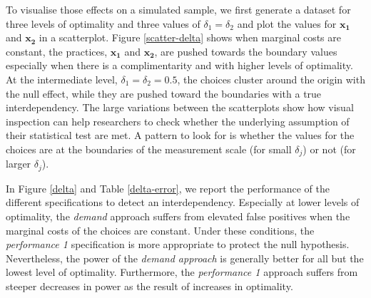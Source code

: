 \documentclass[12pt]{article}
\begin{document}
To visualise those effects on a simulated sample, we first generate a
dataset for three levels of optimality and three values of
\(\delta_1 = \delta_2\) and plot the values for \(\mathbf{x_1}\) and
\(\mathbf{x_2}\) in a scatterplot. Figure \ref{scatter-delta} shows when
marginal costs are constant, the practices, \(\mathbf{x_1}\) and
\(\mathbf{x_2}\), are pushed towards the boundary values especially when
there is a complimentarity and with higher levels of optimality. At the
intermediate level, \(\delta_1 = \delta_2 = 0.5\), the choices cluster
around the origin with the null effect, while they are pushed toward the
boundaries with a true interdependency. The large variations between the
scatterplots show how visual inspection can help researchers to check
whether the underlying assumption of their statistical test are met. A
pattern to look for is whether the values for the choices are at the
boundaries of the measurement scale (for small \(\delta_j\)) or not (for
larger \(\delta_j\)).

In Figure \ref{delta} and Table \ref{delta-error}, we report the
performance of the different specifications to detect an
interdependency. Especially at lower levels of optimality, the
\emph{demand} approach suffers from elevated false positives when the
marginal costs of the choices are constant. Under these conditions, the
\emph{performance 1} specification is more appropriate to protect the
null hypothesis. Nevertheless, the power of the \emph{demand approach}
is generally better for all but the lowest level of optimality.
Furthermore, the \emph{performance 1} approach suffers from steeper
decreases in power as the result of increases in optimality.
\end{document}
